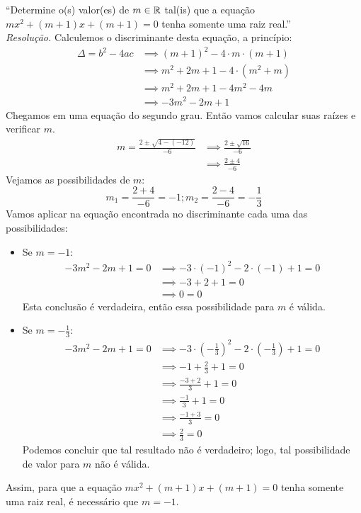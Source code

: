 \enquote{Determine o(s) valor(es) de $m \in \mathbb R$ tal(is) que a equação $mx^2 + (m + 1)x + (m + 1) = 0$ tenha somente uma raiz real.}
\\
\emph{Resolução.} Calculemos o discriminante desta equação, a princípio:
\begin{align*}
    \Delta = b^2 - 4ac & \implies (m + 1)^2 - 4 \cdot m \cdot (m + 1) \\ & \implies 
    m^2 + 2m + 1 - 4 \cdot (m^2 + m) \\ & \implies
    m^2 + 2m + 1 - 4m^2 - 4m \\ & \implies
    -3m^2 - 2m + 1
\end{align*}
Chegamos em uma equação do segundo grau. Então vamos calcular suas raízes e verificar $m$.
\begin{align*}
    m = \frac{2 \pm \sqrt{4 - (-12)}}{-6} & \implies
    \frac{2 \pm \sqrt{16}}{-6} \\ & \implies 
    \frac{2 \pm 4}{-6}
\end{align*}
Vejamos as possibilidades de $m$:
\begin{displaymath}
    m_1 = \frac{2 + 4}{-6} = -1 ; m_2 = \frac{2 - 4}{-6} = -\frac{1}{3}
\end{displaymath}
Vamos aplicar na equação encontrada no discriminante cada uma das possibilidades:
\begin{itemize}
    \item Se $m = -1$:
    \begin{align*}
        -3m^2 - 2m + 1 = 0 & \implies -3\cdot(-1)^2 - 2\cdot(-1) + 1 = 0 \\ & \implies 
        -3 + 2 + 1 = 0 \\ & \implies
        0 = 0
    \end{align*}
    Esta conclusão é verdadeira, então essa possibilidade para $m$ é válida.
    \item Se $m = -\frac{1}{3}$:
    \begin{align*}
        -3m^2 - 2m + 1 = 0 & \implies -3\cdot(-\frac{1}{3})^2 - 2\cdot(-\frac{1}{3}) + 1 = 0 \\ & \implies
        -1 + \frac{2}{3} + 1 = 0 \\ & \implies
        \frac{-3 + 2}{3} + 1 = 0 \\ & \implies
        \frac{-1}{3} + 1 = 0 \\ & \implies
        \frac{-1 + 3}{3} = 0 \\ & \implies
        \frac{2}{3} = 0
    \end{align*}
    Podemos concluir que tal resultado não é verdadeiro; logo, tal possibilidade de valor para $m$ não é válida.
\end{itemize}
Assim, para que a equação $mx^2 + (m + 1)x + (m + 1) = 0$ tenha somente uma raiz real, é necessário que $m = -1$.